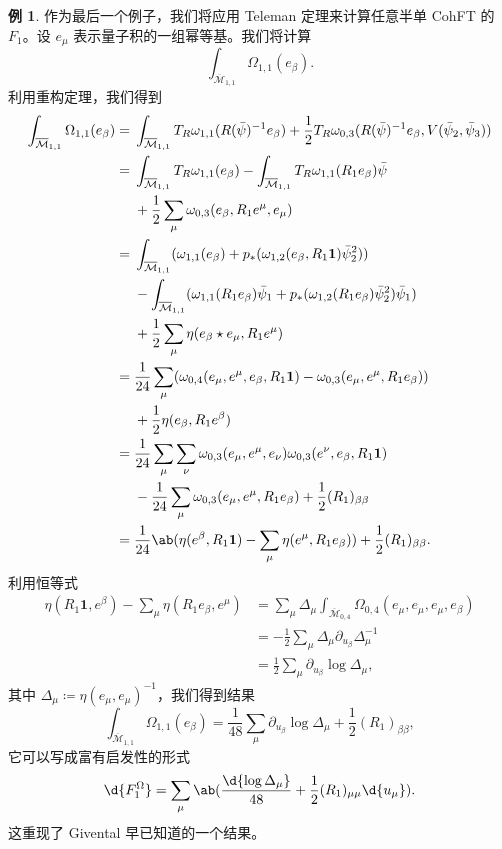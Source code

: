 \documentclass{amsart}
\theoremstyle{definition}
\newtheorem{exm}[thm]{例}
\theoremstyle{remark}
\theoremstyle{plain}
\theoremstyle{definition}
\theoremstyle{remark}
\newcommand{\Mbar}{\overline{\mathcal{M}}}
\newcommand{\1}{\mathbf{1}}
\newcommand{\2}{\mathbf{2}}
\newcommand{\3}{\mathbf{3}}
\begin{document}
\begin{exm}
    作为最后一个例子，我们将应用 Teleman 定理来计算任意半单 CohFT 的 $F_1$。设 $e_{\mu}$ 表示量子积的一组幂等基。我们将计算
    \[ \int_{\Mbar_{1,1}} \Omega_{1,1}(e_{\beta}). \]
    利用重构定理，我们得到
    \begin{align*}
        \int_{\Mbar_{1,1}}\Omega_{1,1}(e_{\beta}) ={}& \int_{\Mbar_{1,1}} T_R \omega_{1,1}(R(\bar{\psi})^{-1} e_{\beta}) + \frac{1}{2} T_R \omega_{0,3}(R(\bar{\psi})^{-1} e_{\beta}, V(\bar{\psi}_2, \bar{\psi}_3)) \\
        ={}& \int_{\Mbar_{1,1}}T_R\omega_{1,1}(e_{\beta}) - \int_{\Mbar_{1,1}} T_R \omega_{1,1}(R_1 e_{\beta})\bar{\psi} \\ 
        &+ \frac{1}{2}\sum_{\mu}  \omega_{0,3}(e_{\beta}, R_1 e^{\mu}, e_{\mu}) \\
        ={}& \int_{\Mbar_{1,1}} ( \omega_{1,1}(e_{\beta}) + p_* ( \omega_{1,2}(e_{\beta}, R_1 \1) \bar{\psi}_2^2 )) \\
        &- \int_{\Mbar_{1,1}} (\omega_{1,1}(R_1 e_{\beta})\bar{\psi}_1 + p_* ( \omega_{1,2}(R_1 e_{\beta}) \bar{\psi}_2^2 ) \bar{\psi}_1) \\
        &+ \frac{1}{2} \sum_{\mu} \eta(e_{\beta} \star e_{\mu}, R_1 e^{\mu}) \\
        ={}& \frac{1}{24} \sum_{\mu} ( \omega_{0,4}(e_{\mu}, e^{\mu}, e_{\beta}, R_1 \1) -\omega_{0,3}(e_{\mu}, e^{\mu}, R_1 e_{\beta}) )\\
        &+ \frac{1}{2} \eta(e_{\beta}, R_1 e^{\beta}) \\
        ={}& \frac{1}{24} \sum_{\mu}\sum_{\nu} \omega_{0,3}(e_{\mu}, e^{\mu}, e_{\nu})\omega_{0,3}(e^{\nu}, e_{\beta}, R_1 \1) \\
        &-\frac{1}{24} \sum_{\mu} \omega_{0,3}(e_{\mu}, e^{\mu}, R_1 e_{\beta}) + \frac{1}{2} (R_1)_{\beta\beta} \\
        ={}& \frac{1}{24} \ab(\eta(e^{\beta}, R_1 \1) - \sum_{\mu} \eta(e^{\mu}, R_1 e_{\beta})) + \frac{1}{2} (R_1)_{\beta\beta}.
    \end{align*}
    利用恒等式
    \begin{align*}
        \eta(R_1 \1, e^{\beta}) - \sum_{\mu} \eta(R_1 e_{\beta}, e^{\mu}) &= \sum_{\mu} \Delta_{\mu} \int_{\Mbar_{0,4}} \Omega_{0,4}(e_{\mu}, e_{\mu}, e_{\mu}, e_{\beta}) \\
        &= -\frac{1}{2}\sum_{\mu} \Delta_{\mu} \partial_{u_{\beta}} \Delta_{\mu}^{-1} \\
        &= \frac{1}{2} \sum_{\mu} \partial_{u_{\beta}} \log \Delta_{\mu},
    \end{align*}
    其中 $\Delta_{\mu} \coloneqq \eta(e_{\mu}, e_{\mu})^{-1}$，我们得到结果
    \[ \int_{\Mbar_{1,1}} \Omega_{1,1}(e_{\beta}) = \frac{1}{48} \sum_{\mu} \partial_{u_{\beta}} \log \Delta_{\mu} + \frac{1}{2} (R_1)_{\beta\beta}, \]
    它可以写成富有启发性的形式
    \[ \d{F_1^{\Omega}} = \sum_{\mu} \ab( \frac{\d{\log \Delta_{\mu}}}{48} + \frac{1}{2} (R_1)_{\mu\mu} \d{u_{\mu}} ). \]
    这重现了 Givental 早已知道的一个结果。
\end{exm}
\end{document}
